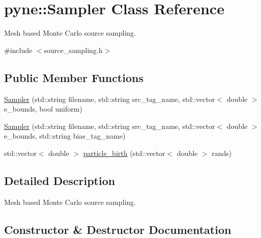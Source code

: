 \hypertarget{classpyne_1_1_sampler}{}\section{pyne\+:\+:Sampler Class Reference}
\label{classpyne_1_1_sampler}


Mesh based Monte Carlo source sampling.  




{\ttfamily \#include $<$source\+\_\+sampling.\+h$>$}

\subsection*{Public Member Functions}
\begin{DoxyCompactItemize}
\item 
\hyperlink{classpyne_1_1_sampler_a57e096205922e6a221f2185a9849c5ed}{Sampler} (std\+::string filename, std\+::string src\+\_\+tag\+\_\+name, std\+::vector$<$ double $>$ e\+\_\+bounds, bool uniform)
\item 
\hyperlink{classpyne_1_1_sampler_a058411845da467ff7421956ba076ac31}{Sampler} (std\+::string filename, std\+::string src\+\_\+tag\+\_\+name, std\+::vector$<$ double $>$ e\+\_\+bounds, std\+::string bias\+\_\+tag\+\_\+name)
\item 
std\+::vector$<$ double $>$ \hyperlink{classpyne_1_1_sampler_aa5d177ee74199617fc08e4a7a7686e8f}{particle\+\_\+birth} (std\+::vector$<$ double $>$ rands)
\end{DoxyCompactItemize}


\subsection{Detailed Description}
Mesh based Monte Carlo source sampling. 

\subsection{Constructor \& Destructor Documentation}
